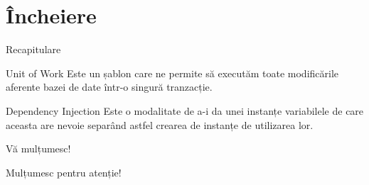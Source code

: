 \documentclass[presentation]{beamer}
\begin{document}
\section{Încheiere}
\label{sec:org455a509}
\begin{frame}[label={sec:org2ed473f}]{Recapitulare}
\pause
\begin{block}{Unit of Work}
\pause
Este un șablon care ne permite să executăm toate modificările aferente bazei de date într-o singură tranzacție.
\pause
\end{block}
\begin{block}{Dependency Injection}
\pause
Este o modalitate de a-i da unei instanțe variabilele de care aceasta are nevoie separând astfel crearea de instanțe de utilizarea lor.
\end{block}
\end{frame}
\begin{frame}[label={sec:org13f10c0}]{Vă mulțumesc!}
\begin{center}
Mulțumesc pentru atenție!
\end{center}
\end{frame}
\end{document}
